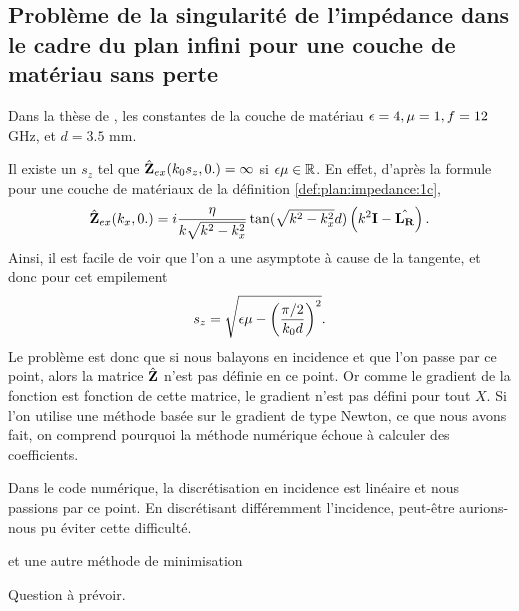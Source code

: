 \subsection{Problème de la singularité de l'impédance dans le cadre du plan infini pour une couche de matériau sans perte}

Dans la thèse de \cite{aubakirov_electromagnetic_2014}, les constantes de la couche de matériau \(\epsilon=4,\mu=1,f=12\) GHz, et \(d=3.5\) mm. 

Il existe un \(s_z\) tel que \(\hat{\mathbf{Z}}_{ex}(k_0s_z,0.) = \infty\) si \(\epsilon\mu\in\mathbb R\).
En effet, d'après la formule pour une couche de matériaux de la définition \ref{def:plan:impedance:1c}, 
\begin{equation}
  \hat{\mathbf{Z}}_{ex}(k_x,0.) = i\dfrac{\eta}{k\sqrt{k^2 - k_x^2}}\tan(\sqrt{k^2 - k_x^2}d)\left(k^2\mathbf{I} - \hat{\mathbf{L_R}}\right).
\end{equation}
Ainsi, il est facile de voir que l'on a une asymptote à cause de la tangente, et donc pour cet empilement
\begin{equation}
  \label{eq:plan:asymptote_1_couche}
  s_z = \sqrt{\epsilon \mu - \left(\dfrac{\pi/2}{k_0 d}\right)^2}.
\end{equation}
Le problème est donc que si nous balayons en incidence et que l'on passe par ce point, alors la matrice \(\hat{\mathbf{Z}}\) n'est pas définie en ce point.
Or comme le gradient de la fonction est fonction de cette matrice, le gradient n'est pas défini pour tout \(X\).
Si l'on utilise une méthode basée sur le gradient de type Newton, ce que nous avons fait, on comprend pourquoi la méthode numérique échoue à calculer des coefficients.

Dans le code numérique, la discrétisation en incidence est linéaire et nous passions par ce point.
En discrétisant différemment l'incidence, peut-être aurions-nous pu éviter cette difficulté.
\begin{REM}
et une autre méthode de minimisation
\end{REM} 
\begin{REP}
  Question à prévoir.
\end{REP}
